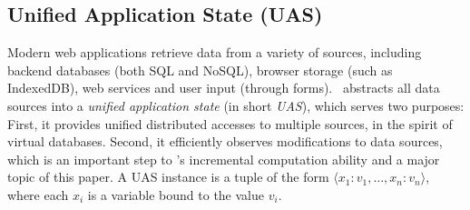 


\subsection{Unified Application State (UAS)}
\label{section:vdb}

Modern web applications retrieve data from a variety of sources, including backend databases (both SQL and NoSQL), browser storage (such as IndexedDB), web services and user input (through forms). \projname\ abstracts all data sources into a \emph{unified application state} (in short \emph{UAS}), which serves two purposes: First, it provides unified distributed accesses to multiple sources, in the spirit of virtual databases. Second, it efficiently observes modifications to data sources, which is an important step to \projname's incremental computation ability and a major topic of this paper. A UAS instance is a tuple of the form $\langle x_1 : v_1, \ldots, x_n : v_n \rangle$, where each $x_i$ is a variable bound to the value $v_i$.



